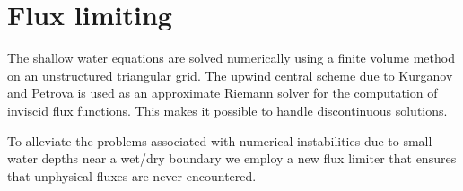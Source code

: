 \documentclass{manual}
\begin{document}
%
%
%
%


\section{Flux limiting}

The shallow water equations are solved numerically using a
finite volume method on an unstructured triangular grid.
The upwind central scheme due to Kurganov and Petrova is used as an
approximate Riemann solver for the computation of inviscid flux functions.
This makes it possible to handle discontinuous solutions.

To alleviate the problems associated with numerical instabilities due to
small water depths near a wet/dry boundary we employ a new flux limiter that
ensures that unphysical fluxes are never encountered.
\end{document}
